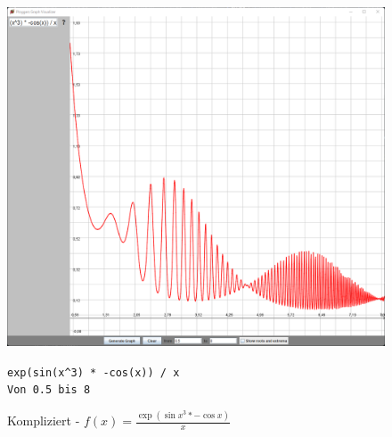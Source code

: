\documentclass[12pt]{article}
\begin{document}
	\begin{figure}[!ht]
		\begin{center}
		\includegraphics[scale=0.5]{images/sample4.png}
		\end{center}
		\caption{Kompliziert - $f(x) = \frac{\exp(\sin{x^3} * -\cos{x})}{x}$}

		\begin{center}
			\texttt{exp(sin(x\textasciicircum 3) * -cos(x)) / x} \\
			\texttt{Von 0.5 bis 8}
		\end{center}
	\end{figure}
\end{document}
